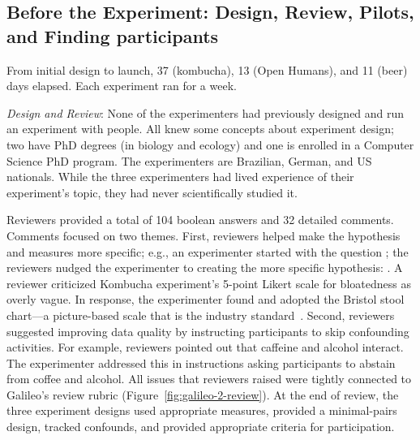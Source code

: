 \subsection{Before the Experiment: Design, Review, Pilots, and Finding participants}
From initial design to launch, 37 (kombucha), 13 (Open Humans), and 11 (beer) days elapsed. Each experiment ran for a week.

\textit{Design and Review}: None of the experimenters had previously designed and run an experiment with people. All knew some concepts about experiment design; two have PhD degrees (in biology and ecology) and one is enrolled in a Computer Science PhD program. The experimenters are Brazilian, German, and US nationals. While the three experimenters had lived experience of their experiment's topic, they had never scientifically studied it.

Reviewers provided a total of 104 boolean answers and 32 detailed comments. Comments focused on two themes. First, reviewers helped make the hypothesis and measures more specific; e.g., an experimenter started with the question \textit{}; the reviewers nudged the experimenter to creating the more specific hypothesis: \textit{}. A reviewer criticized Kombucha experiment's 5-point Likert scale for bloatedness as overly vague. In response, the experimenter found and adopted the Bristol stool chart---a picture-based scale that is the industry standard~\cite{Wikipedia2018}. Second, reviewers suggested improving data quality by instructing participants to skip confounding activities. For example, reviewers pointed out that caffeine and alcohol interact. The experimenter addressed this in instructions asking participants to abstain from coffee and alcohol. All issues that reviewers raised were tightly connected to Galileo's review rubric (Figure~\ref{fig:galileo-2-review}). At the end of review, the three experiment designs used appropriate measures, provided a minimal-pairs design, tracked confounds, and provided appropriate criteria for participation.

